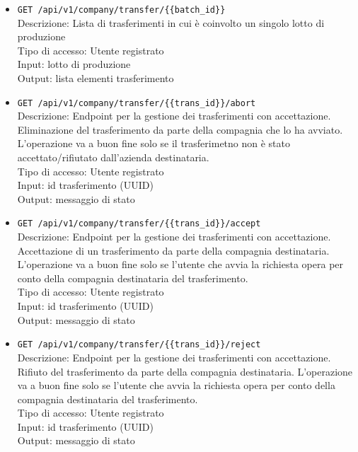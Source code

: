 \documentclass[a4paper,11pt]{article}
\begin{document}
\begin{itemize}
  \item \texttt{GET /api/v1/company/transfer/\{\{batch\_id\}\}}
        \\ Descrizione: Lista di trasferimenti in cui è coinvolto un singolo lotto di produzione
        \\ Tipo di accesso: Utente registrato
        \\ Input: lotto di produzione
        \\ Output: lista elementi trasferimento

  \item \texttt{GET /api/v1/company/transfer/\{\{trans\_id\}\}/abort}
        \\ Descrizione: Endpoint per la gestione dei trasferimenti con accettazione. Eliminazione del trasferimento da parte della compagnia che lo ha avviato. L'operazione va a buon fine solo se il trasferimetno non è stato accettato/rifiutato dall'azienda destinataria.
        \\ Tipo di accesso: Utente registrato
        \\ Input: id trasferimento (UUID)
        \\ Output: messaggio di stato

  \item \texttt{GET /api/v1/company/transfer/\{\{trans\_id\}\}/accept}
        \\ Descrizione: Endpoint per la gestione dei trasferimenti con accettazione. Accettazione di un trasferimento da parte della compagnia destinataria. L'operazione va a buon fine solo se l'utente che avvia la richiesta opera per conto della compagnia destinataria del trasferimento.
        \\ Tipo di accesso: Utente registrato
        \\ Input: id trasferimento (UUID)
        \\ Output: messaggio di stato

  \item \texttt{GET /api/v1/company/transfer/\{\{trans\_id\}\}/reject}
        \\ Descrizione: Endpoint per la gestione dei trasferimenti con accettazione. Rifiuto del trasferimento da parte della compagnia destinataria. L'operazione va a buon fine solo se l'utente che avvia la richiesta opera per conto della compagnia destinataria del trasferimento.
        \\ Tipo di accesso: Utente registrato
        \\ Input: id trasferimento (UUID)
        \\ Output: messaggio di stato


\end{itemize}
\end{document}
